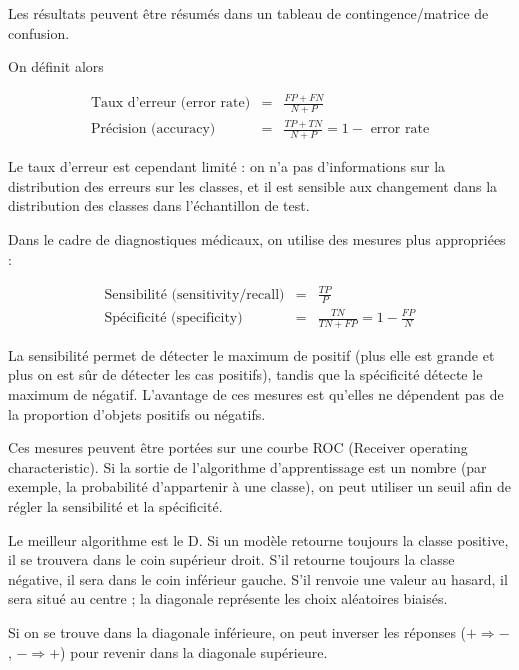 	Les résultats peuvent être résumés dans un tableau de contingence/matrice de confusion.
	
	
	On définit alors
	
	\begin{eqnarray*}
	\text{Taux d'erreur (error rate)} & = & \frac{FP + FN}{N + P} \\
	\text{Précision (accuracy)} & = & \frac{TP + TN}{N + P} = 1 - \text{ error rate}
	\end{eqnarray*}
	
	Le taux d'erreur est cependant limité : on n'a pas d'informations sur la distribution des erreurs sur les classes, et il est sensible aux changement dans la distribution des classes dans l'échantillon de test.
	
	
	Dans le cadre de diagnostiques médicaux, on utilise des mesures plus appropriées :
	
	\begin{eqnarray*}
	\text{Sensibilité (sensitivity/recall)} & = & \frac{TP}{P} \\
	\text{Spécificité (specificity)} & = & \frac{TN}{TN + FP} = 1 - \frac{FP}{N}
	\end{eqnarray*}
		
	La sensibilité permet de détecter le maximum de positif (plus elle est grande et plus on est sûr de détecter les cas positifs), tandis que la spécificité détecte le maximum de négatif. L'avantage de ces mesures est qu'elles ne dépendent pas de la proportion d'objets positifs ou négatifs.
	
	Ces mesures peuvent être portées sur une courbe ROC (Receiver operating characteristic). Si la sortie de l'algorithme d'apprentissage est un nombre (par exemple, la probabilité d'appartenir à une classe), on peut utiliser un seuil afin de régler la sensibilité et la spécificité.
	
	
	Le meilleur algorithme est le D. Si un modèle retourne toujours la classe positive, il se trouvera dans le coin supérieur droit. S'il retourne toujours la classe négative, il sera dans le coin inférieur gauche. S'il renvoie une valeur au hasard, il sera situé au centre ; la diagonale représente les choix aléatoires biaisés.
	
	Si on se trouve dans la diagonale inférieure, on peut inverser les réponses ($+ \Rightarrow -$, $- \Rightarrow +$) pour revenir dans la diagonale supérieure.
	
